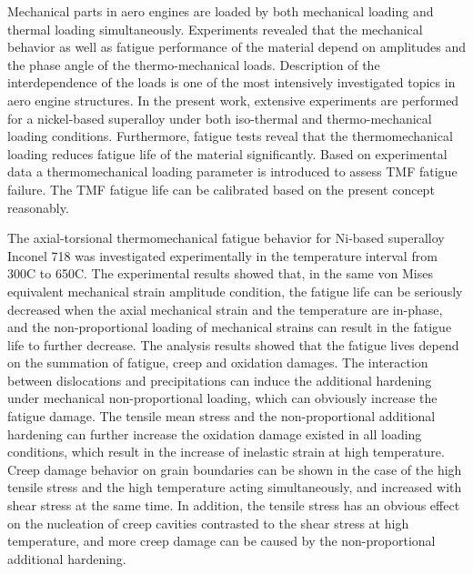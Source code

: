 \noindent
Mechanical parts in aero engines are loaded by both mechanical loading and thermal loading simultaneously. Experiments revealed that the mechanical behavior as well as fatigue performance of the material depend on amplitudes and the phase angle of the thermo-mechanical loads. Description of the interdependence of the loads is one of the most intensively investigated topics in aero engine structures. In the present work, extensive experiments are performed for a nickel-based superalloy under both iso-thermal and thermo-mechanical loading conditions. Furthermore, fatigue tests reveal that the thermomechanical loading reduces fatigue life of the material significantly. Based on experimental data a thermomechanical loading parameter is introduced to assess TMF fatigue failure. The TMF fatigue life can be calibrated based on the present concept reasonably. 

The axial-torsional thermomechanical fatigue behavior for Ni-based superalloy Inconel 718 was investigated experimentally in the temperature interval from 300C to 650C. The experimental results showed that, in the same von Mises equivalent mechanical strain amplitude condition, the fatigue life can be seriously decreased when the axial mechanical strain and the temperature are in-phase, and the non-proportional loading of mechanical strains can result in the fatigue life to further decrease. The analysis results showed that the fatigue lives depend on the summation of fatigue, creep and oxidation damages. The interaction between dislocations and precipitations can induce the additional hardening under mechanical non-proportional loading, which can obviously increase the fatigue damage. The tensile mean stress and the non-proportional additional hardening can further increase the oxidation damage existed in all loading conditions, which result in the increase of inelastic strain at high temperature. Creep damage behavior on grain boundaries can be shown in the case of the high tensile stress and the high temperature acting simultaneously, and increased with shear stress at the same time. In addition, the tensile stress has an obvious effect on the nucleation of creep cavities contrasted to the shear stress at high temperature, and more creep damage can be caused by the non-proportional additional hardening.